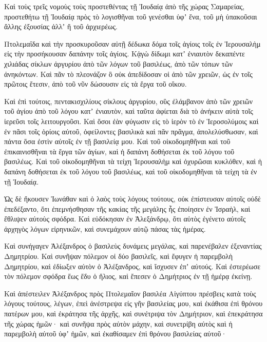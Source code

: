 {\par }{\PP {}Καὶ τοὺς τρεῖς νομοὺς τοὺς προστεθέντας τῇ Ἰουδαίᾳ ἀπὸ τῆς χώρας Σαμαρείας, προστεθήτω τῇ Ἰουδαίᾳ πρὸς τὸ λογισθῆναι τοῦ γενέσθαι ὑφʼ ἕνα, τοῦ μὴ ὑπακοῦσαι ἄλλης ἐξουσίας ἀλλʼ ἢ τοῦ ἀρχιερέως.
\par }{\PP {}Πτολεμαΐδα καὶ τὴν προσκυροῦσαν αὐτῇ δέδωκα δόμα τοῖς ἁγίοις τοῖς ἐν Ἰερουσαλὴμ εἰς τὴν προσήκουσαν δαπάνην τοῖς ἁγίοις.
Κᾀγὼ δίδωμι κατʼ ἐνιαυτὸν δεκαπέντε χιλιάδας σίκλων ἀργυρίου ἀπὸ τῶν λόγων τοῦ βασιλέως, ἀπὸ τῶν τόπων τῶν ἀνηκόντων.
Καὶ πᾶν τὸ πλεονάζον ὃ οὐκ ἀπεδίδοσαν οἱ ἀπὸ τῶν χρειῶν, ὡς ἐν τοῖς πρῶτοις ἔτεσιν, ἀπὸ τοῦ νῦν δώσουσιν εἰς τὰ ἔργα τοῦ οἴκου.
\par }{\PP {}Καὶ ἐπὶ τούτοις, πεντακισχιλίους σίκλους ἀργυρίου, οὓς ἐλάμβανον ἀπὸ τῶν χρειῶν τοῦ ἁγίου ἀπὸ τοῦ λόγου κατʼ ἐνιαυτὸν, καὶ ταῦτα ἀφίεται διὰ τὸ ἀνήκειν αὐτὰ τοῖς ἱερεῦσι τοῖς λειτουργοῦσι.
Καὶ ὅσοι ἐὰν φύγωσιν εἰς τὸ ἱερὸν τὸ ἐν Ἱεροσολύμοις καὶ ἐν πᾶσι τοῖς ὁρίοις αὐτοῦ, ὀφείλοντες βασιλικὰ καὶ πᾶν πρᾶγμα, ἀπολελύσθωσαν, καὶ πάντα ὅσα ἐστὶν αὐτοῖς ἐν τῇ βασιλείᾳ μου.
Καὶ τοῦ οἰκοδομηθῆναι καὶ τοῦ ἐπικαινισθῆναι τὰ ἔργα τῶν ἁγίων, καὶ ἡ δαπάνη δοθήσεται ἐκ τοῦ λόγου τοῦ βασιλέως.
Καὶ τοῦ οἰκοδομηθῆναι τὰ τείχη Ἱερουσαλὴμ καὶ ὀχυρῶσαι κυκλόθεν, καὶ ἡ δαπάνη δοθήσεται ἐκ τοῦ λόγου τοῦ βασιλέως, καὶ τοῦ οἰκοδομηθῆναι τὰ τείχη τὰ ἐν τῇ Ἰουδαίᾳ.
\par }{\PP {}Ὡς δὲ ἤκουσεν Ἰωνάθαν καὶ ὁ λαὸς τοὺς λόγους τούτους, οὐκ ἐπίστευσαν αὐτοῖς οὐδὲ ἐπεδέξαντο, ὅτι ἐπεμνήσθησαν τῆς κακίας τῆς μεγάλης ἧς ἐποίησεν ἐν Ἰσραὴλ, καὶ ἔθλιψεν αὐτοὺς σφόδρα.
Καὶ εὐδόκησαν ἐν Ἀλεξάνδρῳ, ὅτι αὐτὸς ἐγένετο αὐτοῖς ἀρχηγὸς λόγων εἰρηνικῶν, καὶ συνεμάχουν αὐτῷ πάσας τὰς ἡμέρας.
\par }{\PP {}Καὶ συνήγαγεν Ἀλέξανδρος ὁ βασιλεὺς δυνάμεις μεγάλας, καὶ παρενέβαλεν ἐξεναντίας Δημητρίου.
Καὶ συνῆψαν πόλεμον οἱ δύο βασιλεῖς, καὶ ἔφυγεν ἡ παρεμβολὴ Δημητρίου, καὶ ἐδίωξεν αὐτὸν ὁ Ἀλέξανδρος, καὶ ἴσχυσεν ἐπʼ αὐτούς.
Καὶ ἐστερέωσε τὸν πόλεμον σφόδρα ἕως ἔδυ ὁ ἥλιος, καὶ ἔπεσεν ὁ Δημήτριος ἐν τῇ ἡμέρᾳ ἐκείνῃ.
\par }{\PP {}Καὶ ἀπέστειλεν Ἀλέξανδρος πρὸς Πτολεμαῖον βασιλέα Αἰγύπτου πρέσβεις κατὰ τοὺς λόγους τούτους, λέγων,
ἐπεὶ ἀνέστρεψα εἰς γῆν βασιλείας μου, καὶ ἐκάθισα ἐπὶ θρόνου πατέρων μου, καὶ ἐκράτησα τῆς ἀρχῆς, καὶ συνέτριψα τὸν Δημήτριον, καὶ ἐπεκράτησα τῆς χώρας ἡμῶν·
καὶ συνῆψα πρὸς αὐτὸν μάχην, καὶ συνετρίβη αὐτὸς καὶ ἡ παρεμβολὴ αὐτοῦ ὑφʼ ἡμῶν, καὶ ἐκαθίσαμεν ἐπὶ θρόνου βασιλείας αὐτοῦ·
}
